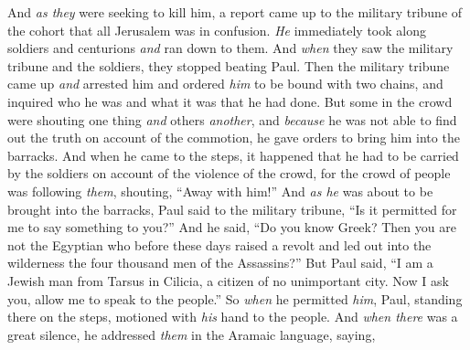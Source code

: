 \begin{biblechapter}
\verse And \textit{as they} were seeking to kill him, a report came up to the military tribune of the cohort that all Jerusalem was in confusion.
\verse \textit{He} immediately took along soldiers and centurions \textit{and} ran down to them. And \textit{when} they saw the military tribune and the soldiers, they stopped beating Paul.
\verse Then the military tribune came up \textit{and} arrested him and ordered \textit{him} to be bound with two chains, and inquired who he was and what it was that he had done.
\verse But some in the crowd were shouting one thing \textit{and} others \textit{another}, and \textit{because} he was not able to find out the truth on account of the commotion, he gave orders to bring him into the barracks.
\verse And when he came to the steps, it happened that he had to be carried by the soldiers on account of the violence of the crowd,
\verse for the crowd of people was following \textit{them}, shouting, “Away with him!”
 And \textit{as he} was about to be brought into the barracks, Paul said to the military tribune, “Is it permitted for me to say something to you?” And he said, “Do you know Greek?
\verse Then you are not the Egyptian who before these days raised a revolt and led out into the wilderness the four thousand men of the Assassins?”
\verse But Paul said, “I am a Jewish man from Tarsus in Cilicia, a citizen of no unimportant city. Now I ask you, allow me to speak to the people.”
\verse So \textit{when} he permitted \textit{him}, Paul, standing there on the steps, motioned with \textit{his} hand to the people. And \textit{when there} was a great silence, he addressed \textit{them} in the Aramaic language, saying,
\end{biblechapter}

